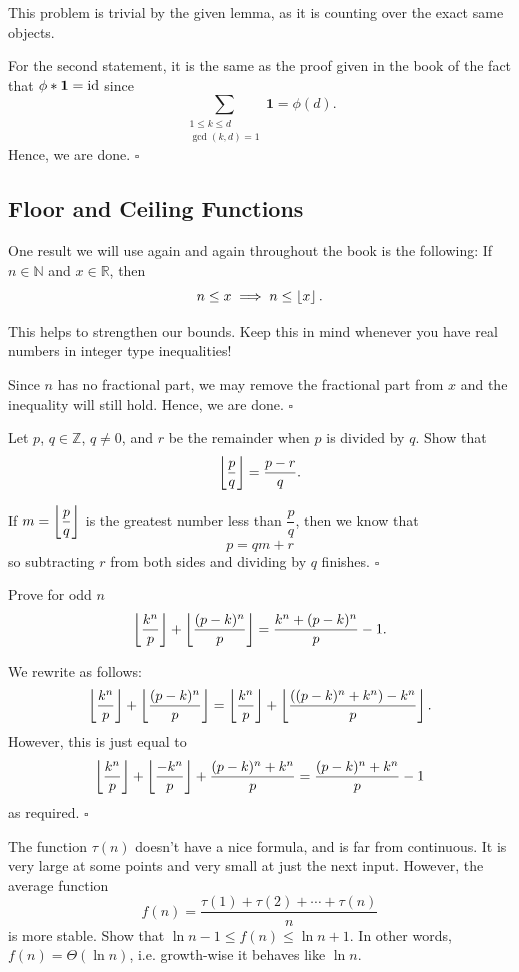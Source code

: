 \documentclass{article}
\begin{document}
This problem is trivial by the given lemma, as it is counting over the exact same objects.

For the second statement, it is the same as the proof given in the book of the fact that $\phi * \mathbf{1} = \operatorname{id}$ since \[\sum_{\substack{1 \le k \le d\\ \gcd(k, d) = 1}} \mathbf{1} = \phi(d).\] Hence, we are done. $\square$

\subsection{Floor and Ceiling Functions}

\begin{problem}[3.5.1]{}
One result we will use again and again throughout the book is the following: If $n \in \mathbb{N}$ and $x \in \mathbb{R}$, then \[n \le x \implies n \le \left\lfloor x \right\rfloor.\]

This helps to strengthen our bounds. Keep this in mind whenever you have real numbers in integer type inequalities!
\end{problem}

Since $n$ has no fractional part, we may remove the fractional part from $x$ and the inequality will still hold. Hence, we are done. $\square$

\begin{problem}[3.5.2]{}
Let $p$, $q \in \mathbb{Z}$, $q \neq 0$, and $r$ be the remainder when $p$ is divided by $q$. Show that \[\left\lfloor \dfrac{p}{q} \right\rfloor = \dfrac{p - r}{q}.\]
\end{problem}

If $m = \left\lfloor \dfrac{p}{q} \right\rfloor$ is the greatest number less than $\dfrac{p}{q}$, then we know that \[p = qm+r\] so subtracting $r$ from both sides and dividing by $q$ finishes. $\square$

\begin{problem}[3.5.3]{}
Prove for odd $n$ \[\left\lfloor \dfrac{k^n}{p} \right\rfloor +\left\lfloor \dfrac{(p - k)^n}{p} \right\rfloor = \dfrac{k^n + (p - k)^n}{p}-1.\]
\end{problem}

We rewrite as follows: \[\left\lfloor \dfrac{k^n}{p} \right\rfloor +\left\lfloor \dfrac{(p - k)^n}{p} \right\rfloor = \left\lfloor \dfrac{k^n}{p} \right\rfloor +\left\lfloor \dfrac{((p - k)^n+k^n) - k^n}{p} \right\rfloor.\] However, this is just equal to \[\left\lfloor \dfrac{k^n}{p} \right\rfloor +\left\lfloor \dfrac{-k^n}{p} \right\rfloor+\dfrac{(p - k)^n+k^n}{p} = \dfrac{(p - k)^n+k^n}{p}-1\] as required. $\square$

\begin{problem}[3.5.4]{}
The function $\tau(n)$ doesn’t have a nice formula, and is far from continuous. It is very large at some points and very small at just the next input. However, the average function \[f(n) = \dfrac{\tau(1) + \tau(2) + \cdots + \tau(n)}{n}\] is more stable. Show that $\ln n - 1 \le f(n) \le \ln n + 1$. In other words, $f(n) = \Theta(\ln n)$, i.e. growth-wise it behaves like $\ln n$.
\end{problem}
\end{document}

